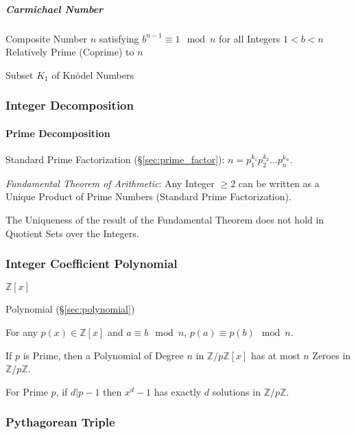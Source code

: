 \subparagraph{Carmichael Number}\label{sec:carmichael_number}\hfill

Composite Number $n$ satisfying $b^{n-1} \equiv 1 \mod n$ for all
Integers $1 < b < n$ Relatively Prime (Coprime) to $n$

Subset $K_1$ of Kn\"odel Numbers



\subsubsection{Integer Decomposition}\label{sec:integer_decomposition}

\paragraph{Prime Decomposition}\label{sec:prime_decomposition}\hfill

Standard Prime Factorization (\S\ref{sec:prime_factor}): $n =
p_1^{k_1} p_2^{k_2} \ldots p_n^{k_n}$.

\emph{Fundamental Theorem of Arithmetic}: Any Integer $\geq 2$ can be
written as a Unique Product of Prime Numbers (Standard Prime
Factorization).

The Uniqueness of the result of the Fundamental Theorem does not hold
in Quotient Sets over the Integers.



\subsubsection{Integer Coefficient Polynomial}
\label{sec:integer_coefficient}

$\mathbb{Z}[x]$

Polynomial (\S\ref{sec:polynomial})

For any $p(x) \in \mathbb{Z}[x]$ and $a \equiv b \mod n$, $p(a) \equiv
p(b) \mod n$.

If $p$ is Prime, then a Polynomial of Degree $n$ in
$\mathbb{Z}/p\mathbb{Z}[x]$ has at most $n$ Zeroes in
$\mathbb{Z}/p\mathbb{Z}$.

For Prime $p$, if $d|p-1$ then $x^d - 1$ has exactly $d$ solutions in
$\mathbb{Z}/p\mathbb{Z}$.



\subsubsection{Pythagorean Triple}\label{sec:pythagorean_triple}

